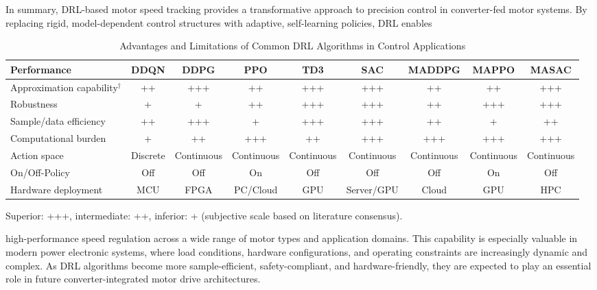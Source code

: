 In summary, DRL-based motor speed tracking provides a transformative approach to precision control in converter-fed motor systems. By replacing rigid, model-dependent control structures with adaptive, self-learning policies, DRL enables 

\begin{table}[t]
\centering
\caption{Advantages and Limitations of Common DRL Algorithms in Control Applications}
\label{tab:DRLcomparison}
\renewcommand{\arraystretch}{1.2}
\begin{tabular}{l|cccccccc}
\hline
\textbf{Performance}               & \textbf{DDQN} & \textbf{DDPG} & \textbf{PPO} & \textbf{TD3} & \textbf{SAC} & \textbf{MADDPG} & \textbf{MAPPO} & \textbf{MASAC} \\
\hline
Approximation capability$^\dag$   & ++  & +++   & ++    & +++   & +++   & ++   & ++   & +++ \\
Robustness                        & +   & +     & ++    & +++   & +++   & ++    & +++    & +++ \\
Sample/data efficiency            & ++  & +++   & +    & +++    & +++   & ++    & +   & ++ \\
Computational burden              & +   & ++    & +++   & ++    & +++   & +++   & +++   & +++ \\
Action space                      & Discrete & Continuous & Continuous & Continuous & Continuous & Continuous & Continuous & Continuous \\ 
On/Off-Policy                     & Off & Off & On & Off & Off & Off & On & Off \\ 
Hardware deployment               & MCU & FPGA & PC/Cloud & GPU & Server/GPU & Cloud & GPU & HPC \\      
\hline
\end{tabular}
\vspace{2mm}
\vspace{1mm}
\begin{tablenotes}
\small
\item Superior: +++, intermediate: ++, inferior: + (subjective scale based on literature consensus).
\end{tablenotes}
\end{table}
high-performance speed regulation across a wide range of motor types and application domains. This capability is especially valuable in modern power electronic systems, where load conditions, hardware configurations, and operating constraints are increasingly dynamic and complex. As DRL algorithms become more sample-efficient, safety-compliant, and hardware-friendly, they are expected to play an essential role in future converter-integrated motor drive architectures.

